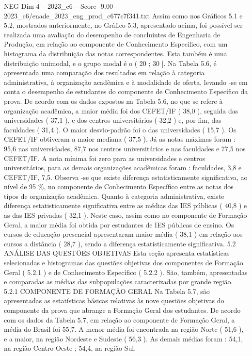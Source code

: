 \begin{textsample}{NEG Dim 4 – 2023\_c6 – Score -9.00 – 2023\_c6/enade\_2023\_eng\_prod\_c677c7f341.txt}
Assim como nos Gráficos 5.1 e 5.2, mostrados anteriormente, no Gráfico 5.3, apresentado acima, foi possível ser realizada uma avaliação do desempenho de concluintes de Engenharia de Produção, em relação ao componente de Conhecimento Específico, com um histograma da distribuição das notas correspondentes.
Esta também é uma distribuição unimodal, e o grupo modal é o ( 20 ; 30 ].
Na Tabela 5.6, é apresentada uma comparação dos resultados em relação à categoria administrativa, à organização acadêmica e à modalidade de oferta, levando -se em conta o desempenho de estudantes do componente de Conhecimento Específico da prova.
De acordo com os dados expostos na Tabela 5.6, no que se refere à organização acadêmica, a maior média foi dos CEFET/IF ( 38,0 ), seguida das universidades ( 37,1 ), e dos centros universitários ( 32,2 ) e, por fim, das faculdades ( 31,4 ).
O maior desvio-padrão foi o das universidades ( 15,7 ).
Os CEFET/IF obtiveram a maior mediana ( 37,5 ).
Já as notas máximas foram : 95,6 nas universidades, 87,7 nos centros universitários e nas faculdades e 77,5 nos CEFET/IF.
A nota mínima foi zero para as universidades e centros universitários, para as demais organizações acadêmicas foram : faculdades, 3,8 e CEFET/IF, 7,5.
Observa -se que existe diferença estatisticamente significativa, ao nível de 95 \%, no componente de Conhecimento Específico entre as notas dos tipos de organização acadêmica.
Quanto à categoria administrativa, existe diferença estatisticamente significativa entre as médias das IES públicas ( 40,8 ) e as das IES privadas ( 32,1 ).
Neste caso, assim como no componente de Formação Geral, a maior média foi obtida por estudantes de IES públicas de ensino.
Os cursos de educação presencial apresentaram maior média ( 38,1 ) em relação aos cursos a distância ( 28,7 ), sendo a diferença estatisticamente significativa. 5.2 ANÁLISE DAS QUESTÕES OBJETIVAS Esta seção apresenta estatísticas selecionadas e histogramas das questões objetivas dos componentes de Formação Geral ( 5.2.1 ) e de Conhecimento Específico ( 5.2.2 ).
São, também, apresentadas e comparadas as médias das subpopulações caracterizadas por grande região. 5.2.1 COMPONENTE DE FORMAÇÃO GERAL Na Tabela 5.7, são apresentadas as estatísticas básicas relativas às nove questões objetivas do componente da prova que abrange a Formação Geral dos estudantes.
De acordo com os dados da Tabela 5.7, em relação ao componente de Formação Geral, a média do Brasil foi 55,7.
A menor média foi encontrada na região Norte ( 51,6 ), e a maior, na região Nordeste e Sudeste ( 56,3 ).
As demais médias foram : 54,1, na região Centro-Oeste ; 54,4, na região Sul.

\end{textsample}
